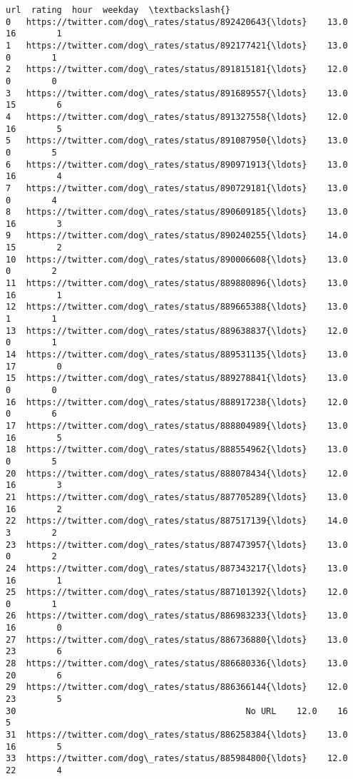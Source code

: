 \documentclass[11pt]{article}
\begin{document}
\begin{Verbatim}[commandchars=\\\{\}]
                                                  url  rating  hour  weekday  \textbackslash{}
0   https://twitter.com/dog\_rates/status/892420643{\ldots}    13.0    16        1   
1   https://twitter.com/dog\_rates/status/892177421{\ldots}    13.0     0        1   
2   https://twitter.com/dog\_rates/status/891815181{\ldots}    12.0     0        0   
3   https://twitter.com/dog\_rates/status/891689557{\ldots}    13.0    15        6   
4   https://twitter.com/dog\_rates/status/891327558{\ldots}    12.0    16        5   
5   https://twitter.com/dog\_rates/status/891087950{\ldots}    13.0     0        5   
6   https://twitter.com/dog\_rates/status/890971913{\ldots}    13.0    16        4   
7   https://twitter.com/dog\_rates/status/890729181{\ldots}    13.0     0        4   
8   https://twitter.com/dog\_rates/status/890609185{\ldots}    13.0    16        3   
9   https://twitter.com/dog\_rates/status/890240255{\ldots}    14.0    15        2   
10  https://twitter.com/dog\_rates/status/890006608{\ldots}    13.0     0        2   
11  https://twitter.com/dog\_rates/status/889880896{\ldots}    13.0    16        1   
12  https://twitter.com/dog\_rates/status/889665388{\ldots}    13.0     1        1   
13  https://twitter.com/dog\_rates/status/889638837{\ldots}    12.0     0        1   
14  https://twitter.com/dog\_rates/status/889531135{\ldots}    13.0    17        0   
15  https://twitter.com/dog\_rates/status/889278841{\ldots}    13.0     0        0   
16  https://twitter.com/dog\_rates/status/888917238{\ldots}    12.0     0        6   
17  https://twitter.com/dog\_rates/status/888804989{\ldots}    13.0    16        5   
18  https://twitter.com/dog\_rates/status/888554962{\ldots}    13.0     0        5   
20  https://twitter.com/dog\_rates/status/888078434{\ldots}    12.0    16        3   
21  https://twitter.com/dog\_rates/status/887705289{\ldots}    13.0    16        2   
22  https://twitter.com/dog\_rates/status/887517139{\ldots}    14.0     3        2   
23  https://twitter.com/dog\_rates/status/887473957{\ldots}    13.0     0        2   
24  https://twitter.com/dog\_rates/status/887343217{\ldots}    13.0    16        1   
25  https://twitter.com/dog\_rates/status/887101392{\ldots}    12.0     0        1   
26  https://twitter.com/dog\_rates/status/886983233{\ldots}    13.0    16        0   
27  https://twitter.com/dog\_rates/status/886736880{\ldots}    13.0    23        6   
28  https://twitter.com/dog\_rates/status/886680336{\ldots}    13.0    20        6   
29  https://twitter.com/dog\_rates/status/886366144{\ldots}    12.0    23        5   
30                                             No URL    12.0    16        5   
31  https://twitter.com/dog\_rates/status/886258384{\ldots}    13.0    16        5   
33  https://twitter.com/dog\_rates/status/885984800{\ldots}    12.0    22        4   


\end{Verbatim}
\end{document}
